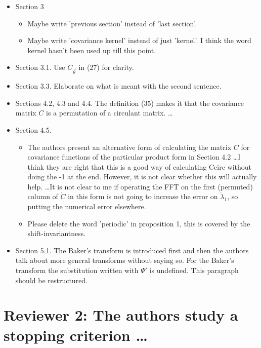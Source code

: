 \documentclass{amsart}
\begin{document}
\begin{itemize}
\item Section 3
\begin{itemize}
\item Maybe write 'previous section' instead of 'last section'.  
\item Maybe write 'covariance kernel' instead of just 'kernel'. I think the word
kernel hasn't been used up till this point.  
\end{itemize}

\item Section 3.1. Use $C_{\vec{\theta}}$ in (27) for clarity. 

\item Section 3.3. Elaborate on what is meant with the second sentence.

\item Sections 4.2, 4.3 and 4.4. 
The definition (35) makes it that the covariance matrix $C$ is a permutation
of a circulant matrix. \ldots

\item  Section 4.5. 
\begin{itemize}
    \item The authors present an alternative form of calculating the matrix $C$ for
covariance functions of the particular product form in Section 4.2 \ldots I think they are right that this is a good
way of calculating Ccirc without doing the -1 at the end.
However, it is not clear whether this will actually help. \ldots It is not clear to me if operating
the FFT on the first (permuted) column of $\mathring{C}$ in this form is not going to
increase the error on $\mathring{\lambda}_1$, so putting the numerical error elsewhere.

\item Please delete the word 'periodic' in proposition 1, this is covered by the
shift-invariantness.
\end{itemize}

\item Section 5.1. The Baker's transform is introduced first and then the authors talk about
more general transforms without saying so. For the Baker's transform the
substitution written with $\Psi'$ is undefined. This paragraph should be
restructured.

\end{itemize}



\section*{Reviewer 2: The authors study a stopping criterion \ldots}
\end{document}
